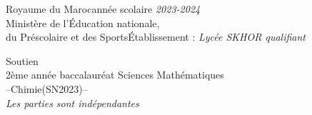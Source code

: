 \documentclass[12pt]{article}
\newcommand\headerMe[2]{\noindent{}#1\hfill#2}
\begin{document}
\headerMe{Royaume du Maroc}{année scolaire \emph{2023-2024}}\\
\headerMe{Ministère de l'Éducation nationale, }{  }\\
\headerMe{du Préscolaire et des Sports}{Établissement : \emph{Lycée SKHOR qualifiant}}\\
\begin{center}
	Soutien\\
    2ème année baccalauréat Sciences Mathématiques\\
\hrulefill
  \Large{--Chimie(SN2023)--}
\hrulefill\\

    \emph{Les  parties sont indépendantes}

    \vspace{-.2cm}
\end{center}
\end{document}
